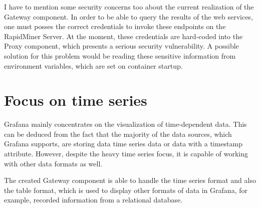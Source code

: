 I have to mention some security concerns too about the current realization of the Gateway component. In order to be able to query the results of the web services, one must posses the correct credentials to invoke these endpoints on the RapidMiner Server. At the moment, these credentials are hard-coded into the Proxy component, which presents a serious security vulnerability. A possible solution for this problem would be reading these sensitive information from environment variables, which are set on container startup.

\section{Focus on time series}

Grafana mainly concentrates on the visualization of time-dependent data. This can be deduced from the fact that the majority of the data sources, which Grafana supports, are storing data time series data or data with a timestamp attribute. However, despite the heavy time series focus, it is capable of working with other data formats as well.

The created Gateway component is able to handle the time series format and also the table format, which is used to display other formats of data in Grafana, for example, recorded information from a relational database.


